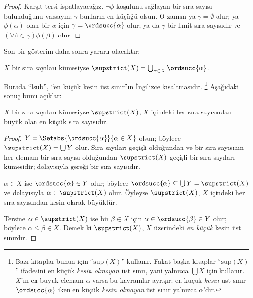 \documentclass[../../../include/open-logic-section]{subfiles}
\begin{document}
\begin{proof}
Karşıt-tersi ispatlayacağız. $\lnot\phi$ koşulunu sağlayan bir sıra sayısı
bulunduğunu varsayın; $\gamma$ bunların en küçüğü olsun. O zaman ya
$\gamma=\emptyset$ olur; ya $\phi(\alpha)$ olan bir $\alpha$ için
$\gamma=\ordsucc{\alpha}$ olur; ya da $\gamma$ bir limit sıra sayısıdır ve
$(\forall\beta\in\gamma)\phi(\beta)$ olur.
\end{proof}
\noindent
Son bir gösterim daha sonra yararlı olacaktır:

\begin{defn}
$X$ bir sıra sayıları kümesiyse
$\supstrict(X)=\bigcup_{\alpha\in X}\ordsucc{\alpha}$.
\end{defn}
\noindent
Burada ``lsub'', ``en küçük kesin üst sınır''ın İngilizce kısaltmasıdır.
\footnote{Bazı kitaplar bunun için ``$\text{sup}(X)$'' kullanır. Fakat
başka kitaplar ``$\text{sup}(X)$'' ifadesini en küçük \emph{kesin olmayan}
üst sınır, yani yalnızca $\bigcup X$ için kullanır. $X$'in en büyük elemanı
$\alpha$ varsa bu kavramlar ayrışır: en küçük \emph{kesin} üst sınır
$\ordsucc{\alpha}$ iken en küçük \emph{kesin olmayan} üst sınır yalnızca
$\alpha$'dır.} Aşağıdaki sonuç bunu açıklar:

\begin{prop}
$X$ bir sıra sayıları kümesiyse $\supstrict(X)$, $X$ içindeki her sıra
sayısından büyük olan en küçük sıra sayısıdır.
\end{prop}

\begin{proof}
$Y=\Setabs{\ordsucc{\alpha}}{\alpha\in X}$ olsun; böylece
$\supstrict(X)=\bigcup Y$ olur. Sıra sayıları geçişli olduğundan ve bir sıra
sayısının her elemanı bir sıra sayısı olduğundan $\supstrict(X)$ geçişli bir
sıra sayıları kümesidir; dolayısıyla
 gereği bir sıra sayısıdır.

$\alpha\in X$ ise $\ordsucc{\alpha}\in Y$ olur; böylece
$\ordsucc{\alpha}\subseteq\bigcup Y=\supstrict(X)$ ve dolayısıyla
$\alpha\in\supstrict(X)$ olur. Öyleyse $\supstrict(X)$, $X$ içindeki her
sıra sayısından kesin olarak büyüktür.

Tersine $\alpha\in\supstrict(X)$ ise bir $\beta\in X$ için
$\alpha\in\ordsucc{\beta}\in Y$ olur; böylece $\alpha\leq\beta\in X$.
Demek ki $\supstrict(X)$, $X$ üzerindeki \emph{en küçük} kesin üst sınırdır.
\end{proof}
\end{document}
